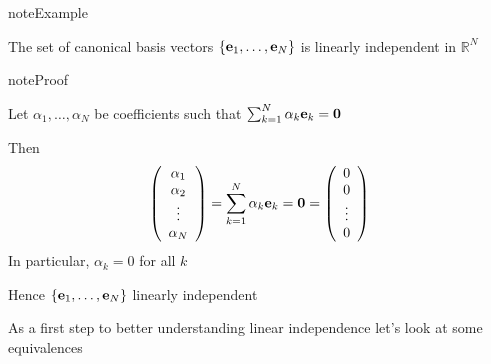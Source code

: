 \documentclass[letterpaper,10pt,english]{jupyterBook}
\begin{document}
\begin{sphinxadmonition}{note}{Example}

\sphinxAtStartPar
The set of canonical basis vectors \(\{{\bf e}_1, \ldots, {\bf e}_N\}\)
is linearly independent in \(\mathbb{R}^N\)
\end{sphinxadmonition}

\begin{sphinxadmonition}{note}{Proof}

\sphinxAtStartPar
Let \(\alpha_1, \ldots, \alpha_N\) be coefficients such that
\(\sum_{k=1}^N \alpha_k {\bf e}_k = {\bf 0}\)

\sphinxAtStartPar
Then
\begin{equation*}
\begin{split}
%
\left(
\begin{array}{c}
\alpha_1 \\
\alpha_2 \\
\vdots \\
\alpha_N
\end{array}
\right)
= \sum_{k=1}^N \alpha_k {\bf e}_k 
= {\bf 0}
=
\left(
\begin{array}{c}
0 \\
0 \\
\vdots \\
0
\end{array}
\right)
%
\end{split}
\end{equation*}
\sphinxAtStartPar
In particular, \(\alpha_k = 0\) for all \(k\)

\sphinxAtStartPar
Hence \(\{{\bf e}_1, \ldots, {\bf e}_N\}\) linearly independent
\end{sphinxadmonition}

\sphinxAtStartPar
As a first step to better understanding linear independence let’s look at some equivalences
\end{document}
